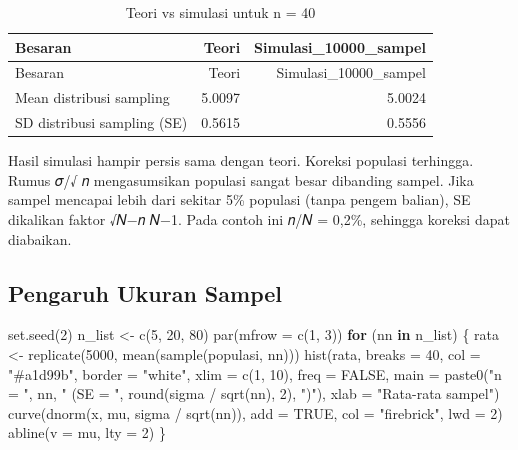 \documentclass[
  indonesian,
  letterpaper,
]{book}
\newenvironment{Shaded}{\begin{snugshade}}{\end{snugshade}}
\newcommand{\AttributeTok}[1]{\textcolor[rgb]{0.40,0.45,0.13}{#1}}
\newcommand{\ConstantTok}[1]{\textcolor[rgb]{0.56,0.35,0.01}{#1}}
\newcommand{\ControlFlowTok}[1]{\textcolor[rgb]{0.00,0.23,0.31}{\textbf{#1}}}
\newcommand{\DecValTok}[1]{\textcolor[rgb]{0.68,0.00,0.00}{#1}}
\newcommand{\FunctionTok}[1]{\textcolor[rgb]{0.28,0.35,0.67}{#1}}
\newcommand{\NormalTok}[1]{\textcolor[rgb]{0.00,0.23,0.31}{#1}}
\newcommand{\OtherTok}[1]{\textcolor[rgb]{0.00,0.23,0.31}{#1}}
\newcommand{\SpecialCharTok}[1]{\textcolor[rgb]{0.37,0.37,0.37}{#1}}
\newcommand{\StringTok}[1]{\textcolor[rgb]{0.13,0.47,0.30}{#1}}
\begin{document}
\begin{longtable}[]{@{}lrr@{}}
\caption{Teori vs simulasi untuk n = 40}\tabularnewline
\toprule\noalign{}
Besaran & Teori & Simulasi\_10000\_sampel \\
\midrule\noalign{}
\endfirsthead
\toprule\noalign{}
Besaran & Teori & Simulasi\_10000\_sampel \\
\midrule\noalign{}
\endhead
\bottomrule\noalign{}
\endlastfoot
Mean distribusi sampling & 5.0097 & 5.0024 \\
SD distribusi sampling (SE) & 0.5615 & 0.5556 \\
\end{longtable}

Hasil simulasi hampir persis sama dengan teori. Koreksi populasi
terhingga. Rumus 𝜎/√ 𝑛 mengasumsikan populasi sangat besar dibanding
sampel. Jika sampel mencapai lebih dari sekitar 5\% populasi (tanpa
pengem balian), SE dikalikan faktor √𝑁−𝑛 𝑁−1. Pada contoh ini 𝑛/𝑁 =
0,2\%, sehingga koreksi dapat diabaikan.

\subsection{Pengaruh Ukuran Sampel}\label{pengaruh-ukuran-sampel}

\begin{Shaded}
\begin{Highlighting}[]
\FunctionTok{set.seed}\NormalTok{(}\DecValTok{2}\NormalTok{)}
\NormalTok{n\_list }\OtherTok{\textless{}{-}} \FunctionTok{c}\NormalTok{(}\DecValTok{5}\NormalTok{, }\DecValTok{20}\NormalTok{, }\DecValTok{80}\NormalTok{)}
\FunctionTok{par}\NormalTok{(}\AttributeTok{mfrow =} \FunctionTok{c}\NormalTok{(}\DecValTok{1}\NormalTok{, }\DecValTok{3}\NormalTok{))}
\ControlFlowTok{for}\NormalTok{ (nn }\ControlFlowTok{in}\NormalTok{ n\_list) \{}
\NormalTok{rata }\OtherTok{\textless{}{-}} \FunctionTok{replicate}\NormalTok{(}\DecValTok{5000}\NormalTok{, }\FunctionTok{mean}\NormalTok{(}\FunctionTok{sample}\NormalTok{(populasi, nn)))}
\FunctionTok{hist}\NormalTok{(rata, }\AttributeTok{breaks =} \DecValTok{40}\NormalTok{, }\AttributeTok{col =} \StringTok{"\#a1d99b"}\NormalTok{, }\AttributeTok{border =} \StringTok{"white"}\NormalTok{, }\AttributeTok{xlim =} \FunctionTok{c}\NormalTok{(}\DecValTok{1}\NormalTok{, }\DecValTok{10}\NormalTok{), }\AttributeTok{freq =} \ConstantTok{FALSE}\NormalTok{,}
\AttributeTok{main =} \FunctionTok{paste0}\NormalTok{(}\StringTok{"n = "}\NormalTok{, nn, }\StringTok{" (SE = "}\NormalTok{, }\FunctionTok{round}\NormalTok{(sigma }\SpecialCharTok{/} \FunctionTok{sqrt}\NormalTok{(nn), }\DecValTok{2}\NormalTok{), }\StringTok{")"}\NormalTok{),}
\AttributeTok{xlab =} \StringTok{"Rata{-}rata sampel"}\NormalTok{)}
\FunctionTok{curve}\NormalTok{(}\FunctionTok{dnorm}\NormalTok{(x, mu, sigma }\SpecialCharTok{/} \FunctionTok{sqrt}\NormalTok{(nn)), }\AttributeTok{add =} \ConstantTok{TRUE}\NormalTok{, }\AttributeTok{col =} \StringTok{"firebrick"}\NormalTok{, }\AttributeTok{lwd =} \DecValTok{2}\NormalTok{)}
\FunctionTok{abline}\NormalTok{(}\AttributeTok{v =}\NormalTok{ mu, }\AttributeTok{lty =} \DecValTok{2}\NormalTok{)}
\NormalTok{\}}
\end{Highlighting}
\end{Shaded}
\end{document}
